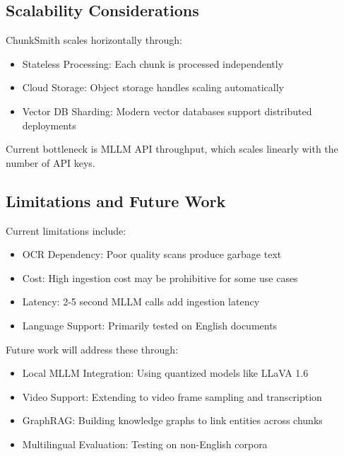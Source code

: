 \documentclass[conference]{IEEEtran}
\begin{document}
\subsection{Scalability Considerations}
ChunkSmith scales horizontally through:
\begin{itemize}
    \item Stateless Processing: Each chunk is processed independently
    \item Cloud Storage: Object storage handles scaling automatically
    \item Vector DB Sharding: Modern vector databases support distributed deployments
\end{itemize}
Current bottleneck is MLLM API throughput, which scales linearly with the number of API keys.

\subsection{Limitations and Future Work}
Current limitations include:
\begin{itemize}
    \item OCR Dependency: Poor quality scans produce garbage text
    \item Cost: High ingestion cost may be prohibitive for some use cases
    \item Latency: 2-5 second MLLM calls add ingestion latency
    \item Language Support: Primarily tested on English documents
\end{itemize}
Future work will address these through:
\begin{itemize}
    \item Local MLLM Integration: Using quantized models like LLaVA 1.6
    \item Video Support: Extending to video frame sampling and transcription
    \item GraphRAG: Building knowledge graphs to link entities across chunks
    \item Multilingual Evaluation: Testing on non-English corpora
\end{itemize}
\end{document}
